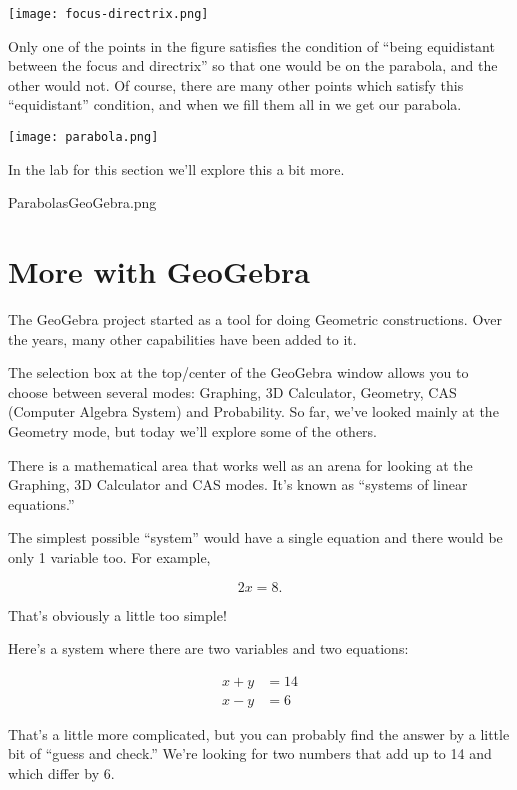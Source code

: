 \centerline{\texttt{[image: focus-directrix.png]}}

Only one of the points in the figure satisfies the condition of ``being equidistant between the focus and directrix'' so that one would be on the parabola, and the other would not.  Of course, there are many other points which satisfy this ``equidistant'' condition, and when we fill them all in we get our parabola.

\centerline{\texttt{[image: parabola.png]}}

In the lab for this section we'll explore this a bit more.

\clearpage
 \begin{worksheet}{16}{Parabolas}{GeoGebra.png}
 
 \end{worksheet}
\clearpage

\section{More with GeoGebra}

The GeoGebra project started as a tool for doing Geometric constructions.  Over the years, many other capabilities have been added to it.

The selection box at the top/center of the GeoGebra window allows you to choose between several modes: Graphing, 3D Calculator, Geometry, CAS (Computer Algebra System) and Probability.  So far, we've looked mainly at the Geometry mode, but today we'll explore some of the others.

There is a mathematical area that works well as an arena for looking at the Graphing, 3D Calculator and CAS modes.  It's known as ``systems of linear equations.''

The simplest possible ``system'' would have a single equation and there would be only 1 variable too.  For example,

\[ 2x = 8. \]

That's obviously a little too simple!  

Here's a system where there are two variables and two equations:

\begin{align*} x + y &= 14 \\ 
 x - y &= 6 
 \end{align*}
 

That's a little more complicated, but you can probably find the answer by a little bit of ``guess and check.''  We're looking for two numbers that add up to 14 and which differ by 6.

